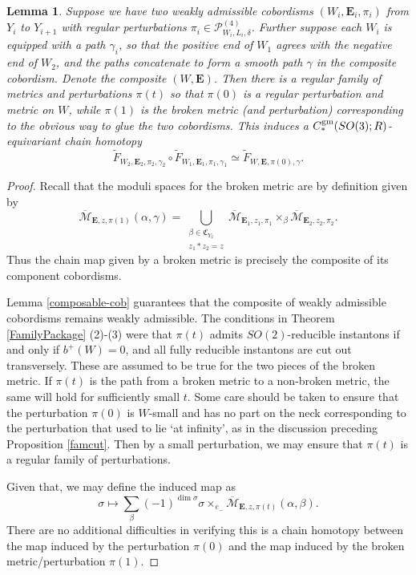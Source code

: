\documentclass{memo-l}
\newtheorem{lemma}[theorem]{Lemma}
\theoremstyle{definition}
\theoremstyle{remark}
\numberwithin{section}{chapter}
\numberwithin{equation}{chapter}
\begin{document}
\begin{lemma}\label{composition}Suppose we have two weakly admissible cobordisms $(W_i, \mathbf{E}_i, \pi_i)$ from $Y_i$ to $Y_{i+1}$ with regular perturbations $\pi_i \in \mathcal P^{(4)}_{W_i, L_i, \delta}$. Further suppose each $W_i$ is equipped with a path $\gamma_i$, so that the positive end of $W_1$ agrees with the negative end of $W_2$, and the paths concatenate to form a smooth path $\gamma$ in the composite cobordism. Denote the composite $(W, \mathbf{E})$. Then there is a regular family of metrics and perturbations $\pi(t)$ so that $\pi(0)$ is a regular perturbation and metric on $W$, while $\pi(1)$ is the broken metric (and perturbation) corresponding to the obvious way to glue the two cobordisms. This induces a $C_*^{\textup{gm}}(SO(3);R)$-equivariant chain homotopy $$\widetilde F_{W_2, \mathbf{E}_2, \pi_2, \gamma_2} \circ \widetilde F_{W_1, \mathbf{E}_1, \pi_1, \gamma_1} \simeq \widetilde F_{W, \mathbf{E}, \pi(0), \gamma}.$$
\end{lemma}
\begin{proof}Recall that the moduli spaces for the broken metric are by definition given by $$\overline{\mathcal M}_{\mathbf{E},z,\pi(1)}(\alpha, \gamma) = \bigcup_{\substack{\beta \in \mathfrak C_{Y_2}\\ z_1 * z_2 = z}} \overline{\mathcal M}_{\mathbf{E}_1,z_1,\pi_1} \times_{\beta} \overline{\mathcal M}_{\mathbf{E}_2, z_2, \pi_2}.$$ Thus the chain map given by a broken metric is precisely the composite of its component cobordisms.

Lemma \ref{composable-cob} guarantees that the composite of weakly admissible cobordisms remains weakly admissible. The conditions in Theorem \ref{FamilyPackage} (2)-(3) were that $\pi(t)$ admits $SO(2)$-reducible instantons if and only if $b^+(W) = 0$, and all fully reducible instantons are cut out transversely. These are assumed to be true for the two pieces of the broken metric. If $\pi(t)$ is the path from a broken metric to a non-broken metric, the same will hold for sufficiently small $t$. Some care should be taken to ensure that the perturbation $\pi(0)$ is $W$-small and has no part on the neck corresponding to the perturbation that used to lie `at infinity', as in the discussion preceding Proposition \ref{famcut}. Then by a small perturbation, we may ensure that $\pi(t)$ is a regular family of perturbations.

Given that, we may define the induced map as 
$$\sigma \mapsto \sum_\beta (-1)^{\dim \sigma} \sigma \times_{e_-}\overline{\mathcal M}_{\mathbf{E},z,\pi(t)}(\alpha, \beta).$$ 
There are no additional difficulties in verifying this is a chain homotopy between the map induced by the perturbation $\pi(0)$ and the map induced by the broken metric/perturbation $\pi(1)$.
\end{proof}
\end{document}
